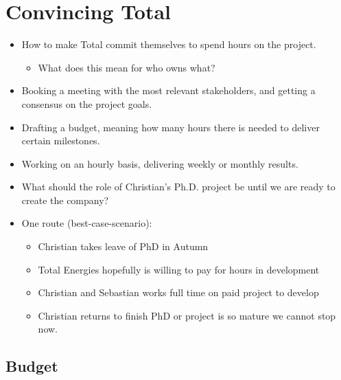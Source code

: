 \documentclass{article}
\begin{document}
\section{Convincing Total}
\begin{itemize}
    \item How to make Total commit themselves to spend hours on the project.
    \begin{itemize}
        \item What does this mean for who owns what?
    \end{itemize}
    \item Booking a meeting with the most relevant stakeholders, and getting a consensus on the project goals.
    \item Drafting a budget, meaning how many hours there is needed to deliver certain milestones.
    \item Working on an hourly basis, delivering weekly or monthly results.
    \item What should the role of Christian's Ph.D. project be until we are ready to create the company?
    \item One route (best-case-scenario): 
    \begin{itemize}
        \item Christian takes leave of PhD in Autumn
        \item Total Energies hopefully is willing to pay for hours in development
        \item Christian and Sebastian works full time on paid project to develop
        \item Christian returns to finish PhD or project is so mature we cannot stop now.
    \end{itemize}
\end{itemize}

\subsection{Budget}
\end{document}
